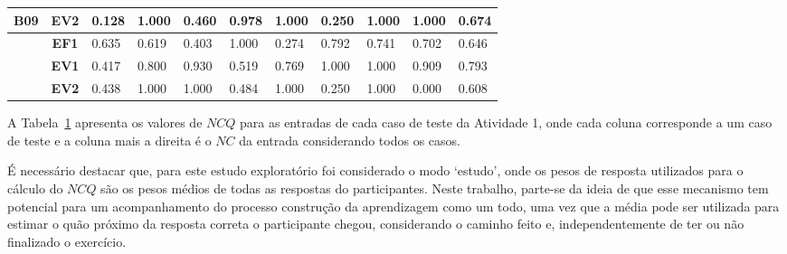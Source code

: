 \begin{table}[htbp]
\begin{tabular}{|cclllllllll|}
		\multicolumn{1}{|c|}{\multirow{-3}{*}{\cellcolor[HTML]{F2F2F2}\textbf{B09}}} & \multicolumn{1}{c|}{\textbf{EV2}} & \multicolumn{1}{l|}{0.128} & \multicolumn{1}{l|}{1.000} & \multicolumn{1}{l|}{0.460} & \multicolumn{1}{l|}{0.978} & \multicolumn{1}{l|}{1.000} & \multicolumn{1}{l|}{0.250} & \multicolumn{1}{l|}{1.000} & \multicolumn{1}{l|}{1.000} & 0.674 \\ \hline
		\rowcolor[HTML]{F2F2F2} 
		\multicolumn{1}{|c|}{\cellcolor[HTML]{F2F2F2}} & \multicolumn{1}{c|}{\cellcolor[HTML]{F2F2F2}\textbf{EF1}} & \multicolumn{1}{l|}{\cellcolor[HTML]{F2F2F2}0.635} & \multicolumn{1}{l|}{\cellcolor[HTML]{F2F2F2}0.619} & \multicolumn{1}{l|}{\cellcolor[HTML]{F2F2F2}0.403} & \multicolumn{1}{l|}{\cellcolor[HTML]{F2F2F2}1.000} & \multicolumn{1}{l|}{\cellcolor[HTML]{F2F2F2}0.274} & \multicolumn{1}{l|}{\cellcolor[HTML]{F2F2F2}0.792} & \multicolumn{1}{l|}{\cellcolor[HTML]{F2F2F2}0.741} & \multicolumn{1}{l|}{\cellcolor[HTML]{F2F2F2}0.702} & 0.646 \\ \cline{2-11} 
		\multicolumn{1}{|c|}{\cellcolor[HTML]{F2F2F2}} & \multicolumn{1}{c|}{\textbf{EV1}} & \multicolumn{1}{l|}{0.417} & \multicolumn{1}{l|}{0.800} & \multicolumn{1}{l|}{0.930} & \multicolumn{1}{l|}{0.519} & \multicolumn{1}{l|}{0.769} & \multicolumn{1}{l|}{1.000} & \multicolumn{1}{l|}{1.000} & \multicolumn{1}{l|}{0.909} & 0.793 \\ \cline{2-11} 
		\rowcolor[HTML]{F2F2F2} 
		\multicolumn{1}{|c|}{\multirow{-3}{*}{\cellcolor[HTML]{F2F2F2}\textbf{B10}}} & \multicolumn{1}{c|}{\cellcolor[HTML]{F2F2F2}\textbf{EV2}} & \multicolumn{1}{l|}{\cellcolor[HTML]{F2F2F2}0.438} & \multicolumn{1}{l|}{\cellcolor[HTML]{F2F2F2}1.000} & \multicolumn{1}{l|}{\cellcolor[HTML]{F2F2F2}1.000} & \multicolumn{1}{l|}{\cellcolor[HTML]{F2F2F2}0.484} & \multicolumn{1}{l|}{\cellcolor[HTML]{F2F2F2}1.000} & \multicolumn{1}{l|}{\cellcolor[HTML]{F2F2F2}0.250} & \multicolumn{1}{l|}{\cellcolor[HTML]{F2F2F2}1.000} & \multicolumn{1}{l|}{\cellcolor[HTML]{F2F2F2}0.000} & 0.608 \\ \hline
	\end{tabular}
	\label{tab:F3A1_NC_entradas_semagrupamento}
\end{table}

A Tabela~\ref{tab:F3A1_NC_entradas_semagrupamento} apresenta os valores de $NCQ$ para as entradas de cada caso de teste da Atividade 1, onde cada coluna corresponde a um caso de teste e a coluna mais a direita é o $NC$ da entrada considerando todos os casos. 

É necessário destacar que, para este estudo exploratório foi considerado o modo `estudo', onde os pesos de resposta utilizados para o cálculo do $NCQ$ são os pesos médios de todas as respostas do participantes. Neste trabalho, parte-se da ideia de que esse mecanismo tem potencial para um acompanhamento do processo construção da aprendizagem como um todo, uma vez que a média pode ser utilizada para estimar o quão próximo da resposta correta o participante chegou, considerando o caminho feito e, independentemente de ter ou não finalizado o exercício.

